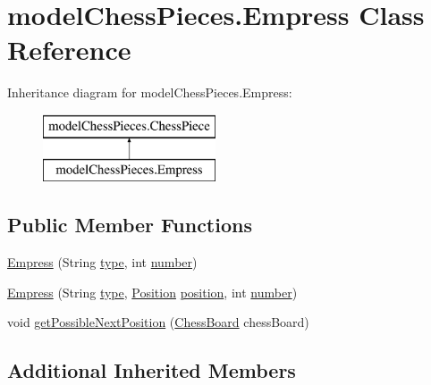\hypertarget{classmodel_chess_pieces_1_1_empress}{\section{model\+Chess\+Pieces.\+Empress Class Reference}
\label{classmodel_chess_pieces_1_1_empress}
}
Inheritance diagram for model\+Chess\+Pieces.\+Empress\+:\begin{figure}[H]
\begin{center}
\leavevmode
\includegraphics[height=2.000000cm]{classmodel_chess_pieces_1_1_empress}
\end{center}
\end{figure}
\subsection*{Public Member Functions}
\begin{DoxyCompactItemize}
\item 
\hyperlink{classmodel_chess_pieces_1_1_empress_a6e3bd690dae8ab6f26ece63c27f0e144}{Empress} (String \hyperlink{classmodel_chess_pieces_1_1_chess_piece_a195487ca88c197af7c1604247be31db2}{type}, int \hyperlink{classmodel_chess_pieces_1_1_chess_piece_a979e63b99128333883acedc38d25dc87}{number})
\item 
\hyperlink{classmodel_chess_pieces_1_1_empress_ac38cc0d134a721d07434d3d9b9793e30}{Empress} (String \hyperlink{classmodel_chess_pieces_1_1_chess_piece_a195487ca88c197af7c1604247be31db2}{type}, \hyperlink{classmodel_core_1_1_position}{Position} \hyperlink{classmodel_chess_pieces_1_1_chess_piece_a3d4362d5b28f6edb14161196d9c6807d}{position}, int \hyperlink{classmodel_chess_pieces_1_1_chess_piece_a979e63b99128333883acedc38d25dc87}{number})
\item 
void \hyperlink{classmodel_chess_pieces_1_1_empress_aaa970b6e95d691e6c6f912ea4f1d91bb}{get\+Possible\+Next\+Position} (\hyperlink{classmodel_core_1_1_chess_board}{Chess\+Board} chess\+Board)
\end{DoxyCompactItemize}
\subsection*{Additional Inherited Members}


